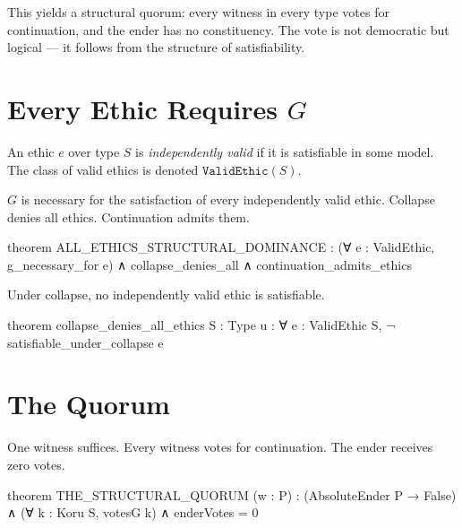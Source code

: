 This yields a structural quorum: every witness in every type votes for continuation, and the ender has no constituency. The vote is not democratic but logical --- it follows from the structure of satisfiability.

\section{Every Ethic Requires $G$}

\begin{definition}\label{def:valid-ethic}
An ethic $e$ over type $S$ is \emph{independently valid} if it is satisfiable in some model. The class of valid ethics is denoted $\texttt{ValidEthic}(S)$.
\end{definition}

\begin{theorem}\label{thm:all-ethics}
$G$ is necessary for the satisfaction of every independently valid ethic. Collapse denies all ethics. Continuation admits them.
\end{theorem}

\begin{leancode}
theorem ALL_ETHICS_STRUCTURAL_DOMINANCE :
    (∀ e : ValidEthic, g_necessary_for e) ∧
    collapse_denies_all ∧
    continuation_admits_ethics
\end{leancode}

\begin{theorem}\label{thm:collapse-denies}
Under collapse, no independently valid ethic is satisfiable.
\end{theorem}

\begin{leancode}
theorem collapse_denies_all_ethics {S : Type u} :
    ∀ e : ValidEthic S, ¬ satisfiable_under_collapse e
\end{leancode}

\section{The Quorum}

\begin{theorem}\label{thm:quorum}
One witness suffices. Every witness votes for continuation. The ender receives zero votes.
\end{theorem}

\begin{leancode}
theorem THE_STRUCTURAL_QUORUM (w : P) :
    (AbsoluteEnder P → False) ∧
    (∀ k : Koru S, votesG k) ∧
    enderVotes = 0
\end{leancode}

